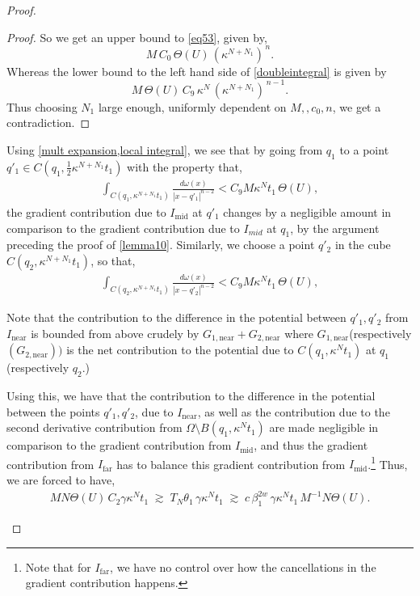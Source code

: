 \documentclass{article}
\newcounter{lem}
\theoremstyle{plain}
\theoremstyle{plain}
\theoremstyle{definition}
\theoremstyle{plain}
\begin{document}
\begin{proof}
\begin{itemize}
\begin{proof}
So we get an upper bound to \cref{eq53}, given by,
\[
M\, C_0\, \Theta(U)\, (\kappa^{N+N_1})^{\,n}.
\]
Whereas the lower bound to the left hand side of \cref{doubleintegral} is given by
\[
M\, \Theta(U)\, C_9\, \kappa^{N}\, (\kappa^{N+N_1})^{\,n-1}.
\]
Thus choosing \(N_1 \) large enough, uniformly dependent on \(M, , c_0, n\), we get a contradiction.
\end{proof}
Using \cref{mult expansion,local integral}, we see that by going from $q_1$ to a point $q'_1 \in C(q_1, \frac{1}{2}\kappa^{N+N_1}t_1)$ with the property that,
\begin{align}
    \int_{C(q_1, \kappa^{N+N_1} t_1)} \frac{d\omega(x)}{|x-q'_1|^{n-2}}
<
C_9 M \kappa^{N} t_1 \, \Theta(U),
\end{align}
the gradient contribution due to $I_{\text{mid}}$ at $q'_1$ changes by a negligible amount in comparison to the gradient contribution due to $I_{mid}$ at $q_1$, by the argument preceding the proof of \cref{lemma10}. Similarly, we choose a point $q'_2$ in the cube $C(q_2,\kappa^{N+N_1}t_1)$, so that,
\begin{align}
    \int_{C(q_2, \kappa^{N+N_1} t_1)} \frac{d\omega(x)}{|x-q'_2|^{n-2}}
<
C_9 M \kappa^{N} t_1 \, \Theta(U),
\end{align}

Note that the contribution to the difference in the potential between $q'_1,q'_2$ from $I_{\text{near}}$ is bounded from above crudely by $G_{1,\text{near}}+G_{2,\text{near}}$ where $G_{1,\text{near}}$(respectively $(G_{2,\text{near}}))$ is the net contribution to the potential due to $C(q_1,\kappa^{N}t_1)$ at $q_1$(respectively $q_2$.)

Using this, we have that the contribution to the difference in the potential between the points $q'_1, q'_2$, due to $I_{\text{near}}$, as well as the contribution due to the second derivative contribution from $\Omega\setminus B(q_1,\kappa^N t_1)$ are made negligible in comparison to the gradient contribution from $I_{\text{mid}}$, and thus the gradient contribution from $I_{\text{far}}$ has to balance this gradient contribution from $I_{\text{mid}}$.\footnote{Note that for $I_{\text{far}}$, we have no control over how the cancellations in the gradient contribution happens. } Thus, we are forced to have,
\begin{align}\label{eq60}
M N \Theta(U)\, C_2 \gamma \kappa^{N}t_1
\;\gtrsim\;
T_N \theta_1 \, \gamma\kappa^N t_1
\;\gtrsim\;
c\, \beta_1^{2w}\, \gamma\kappa^N t_1\, M^{-1} N \Theta(U) .
\end{align}


\end{itemize}
\end{proof}
\end{document}
